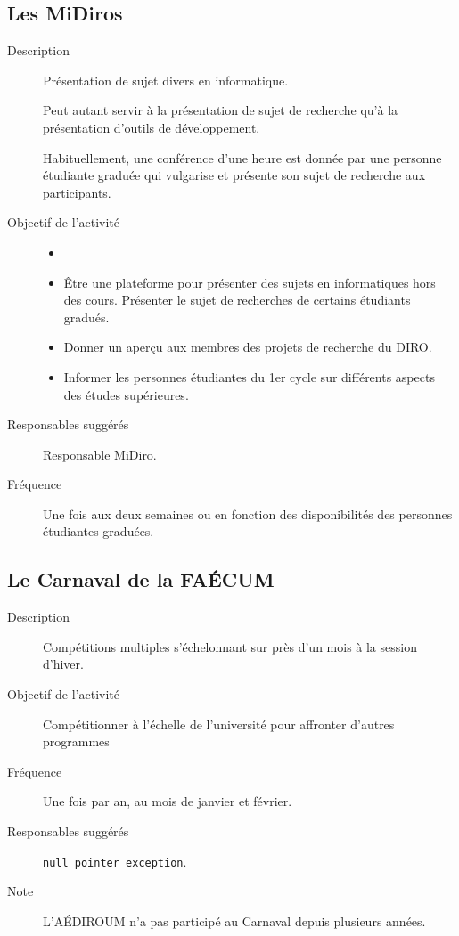 \documentclass{aediroum}
\begin{document}
\subsection{Les MiDiros}
\begin{description}
	\item[Description] Présentation de sujet divers en informatique.

	Peut autant servir à la présentation de sujet de recherche qu'à la présentation d'outils de développement.

	Habituellement, une conférence d'une heure est donnée par une personne étudiante graduée qui vulgarise et présente son sujet de recherche aux participants.
	\item[Objectif de l'activité]
	\begin{itemize}
		\item[]
		\item Être une plateforme pour présenter des sujets en informatiques hors des cours. Présenter le sujet de recherches de certains étudiants gradués.
		\item Donner un aperçu aux membres des projets de recherche du DIRO.
		\item Informer les personnes étudiantes du 1er cycle sur différents aspects des études supérieures.
	\end{itemize}
	\item[Responsables suggérés] Responsable MiDiro.
 	\item[Fréquence] Une fois aux deux semaines ou en fonction des disponibilités des personnes étudiantes graduées.
\end{description}

\subsection{Le Carnaval de la FAÉCUM}
\begin{description}
	\item[Description] Compétitions multiples s'échelonnant sur près d'un mois à la session d'hiver.
	\item[Objectif de l'activité] Compétitionner à l'échelle de l'université pour affronter d'autres programmes
	\item[Fréquence] Une fois par an, au mois de janvier et février.
	\item[Responsables suggérés] \texttt{null pointer exception}.
	\item[Note] L'AÉDIROUM n'a pas participé au Carnaval depuis plusieurs années.
\end{description}
\end{document}
